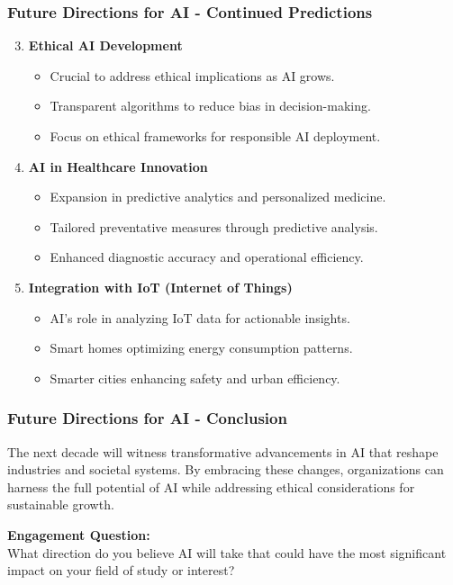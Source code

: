 \documentclass{beamer}
\begin{document}
\begin{frame}[fragile]
    \frametitle{Future Directions for AI - Continued Predictions}
    \begin{enumerate}
        \setcounter{enumi}{2} %
        \item \textbf{Ethical AI Development}
            \begin{itemize}
                \item Crucial to address ethical implications as AI grows.
                \item Transparent algorithms to reduce bias in decision-making.
                \item Focus on ethical frameworks for responsible AI deployment.
            \end{itemize}

        \item \textbf{AI in Healthcare Innovation}
            \begin{itemize}
                \item Expansion in predictive analytics and personalized medicine.
                \item Tailored preventative measures through predictive analysis.
                \item Enhanced diagnostic accuracy and operational efficiency.
            \end{itemize}
        
        \item \textbf{Integration with IoT (Internet of Things)}
            \begin{itemize}
                \item AI's role in analyzing IoT data for actionable insights.
                \item Smart homes optimizing energy consumption patterns.
                \item Smarter cities enhancing safety and urban efficiency.
            \end{itemize}
    \end{enumerate}
\end{frame}

\begin{frame}[fragile]
    \frametitle{Future Directions for AI - Conclusion}
    The next decade will witness transformative advancements in AI that reshape industries and societal systems. By embracing these changes, organizations can harness the full potential of AI while addressing ethical considerations for sustainable growth.
    
    \textbf{Engagement Question:} \\
    What direction do you believe AI will take that could have the most significant impact on your field of study or interest?
\end{frame}
\end{document}
